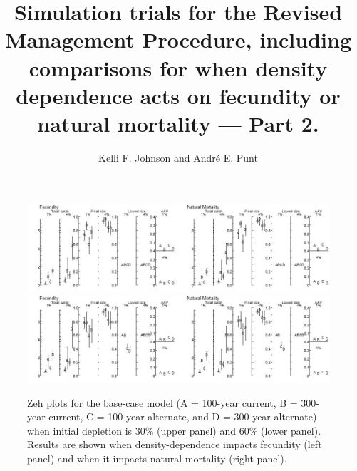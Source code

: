 \documentclass{article}\usepackage[]{graphicx}\usepackage[]{color}
\providecommand\phantomsection{}
\begin{document}
 \title{Simulation trials for the Revised Management Procedure, including comparisons for when density dependence acts on fecundity or natural mortality — Part 2.}
 \author{Kelli F. Johnson and Andr\'{e} E. Punt}




\begin{landscape}

\phantomsection
{}


\begin{figure}[H]
\centering
\includegraphics[]{SC66aRMP10_Part2_T1-R.jpeg}
\includegraphics[]{SC66aRMP10_Part2_T1-S.jpeg}
\caption{
Zeh plots for the base-case model
(A = 100-year current, B = 300-year current, C = 100-year alternate, and D = 300-year alternate)
when initial depletion is 30\% (upper panel) and 60\% (lower panel).
Results are shown when density-dependence impacts fecundity (left panel) and when it impacts natural mortality (right panel).
}
\end{figure}




\end{landscape}
\end{document}
